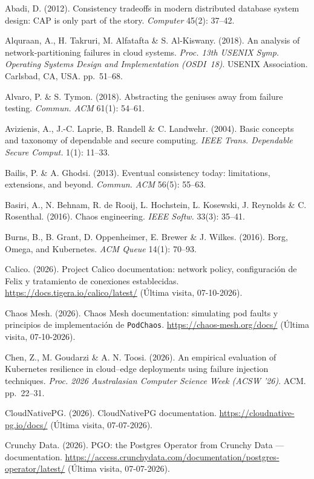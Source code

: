\documentclass[12pt,twocolumn,letterpaper]{article}
\begin{document}
Abadi, D. (2012). Consistency tradeoffs in modern distributed database system design: CAP is only part of the story. \textit{Computer} 45(2): 37--42.\par
Alquraan, A., H. Takruri, M. Alfatafta \& S. Al-Kiswany. (2018). An analysis of network-partitioning failures in cloud systems. \textit{Proc. 13th USENIX Symp. Operating Systems Design and Implementation (OSDI~18)}. USENIX Association. Carlsbad, CA, USA. pp.~51--68.\par
Alvaro, P. \& S. Tymon. (2018). Abstracting the geniuses away from failure testing. \textit{Commun. ACM} 61(1): 54--61.\par
Avizienis, A., J.-C. Laprie, B. Randell \& C. Landwehr. (2004). Basic concepts and taxonomy of dependable and secure computing. \textit{IEEE Trans. Dependable Secure Comput.} 1(1): 11--33.\par
Bailis, P. \& A. Ghodsi. (2013). Eventual consistency today: limitations, extensions, and beyond. \textit{Commun. ACM} 56(5): 55--63.\par
Basiri, A., N. Behnam, R. de Rooij, L. Hochstein, L. Kosewski, J. Reynolds \& C. Rosenthal. (2016). Chaos engineering. \textit{IEEE Softw.} 33(3): 35--41.\par
Burns, B., B. Grant, D. Oppenheimer, E. Brewer \& J. Wilkes. (2016). Borg, Omega, and Kubernetes. \textit{ACM Queue} 14(1): 70--93.\par
Calico. (2026). Project Calico documentation: network policy, configuración de Felix y tratamiento de conexiones establecidas. \url{https://docs.tigera.io/calico/latest/} (Última visita, 07-10-2026).\par
Chaos Mesh. (2026). Chaos Mesh documentation: simulating pod faults y principios de implementación de \texttt{PodChaos}. \url{https://chaos-mesh.org/docs/} (Última visita, 07-10-2026).\par
Chen, Z., M. Goudarzi \& A. N. Toosi. (2026). An empirical evaluation of Kubernetes resilience in cloud--edge deployments using failure injection techniques. \textit{Proc. 2026 Australasian Computer Science Week (ACSW '26)}. ACM. pp.~22--31.\par
CloudNativePG. (2026). CloudNativePG documentation. \url{https://cloudnative-pg.io/docs/} (Última visita, 07-07-2026).\par
Crunchy Data. (2026). PGO: the Postgres Operator from Crunchy Data --- documentation. \url{https://access.crunchydata.com/documentation/postgres-operator/latest/} (Última visita, 07-07-2026).\par
\end{document}
